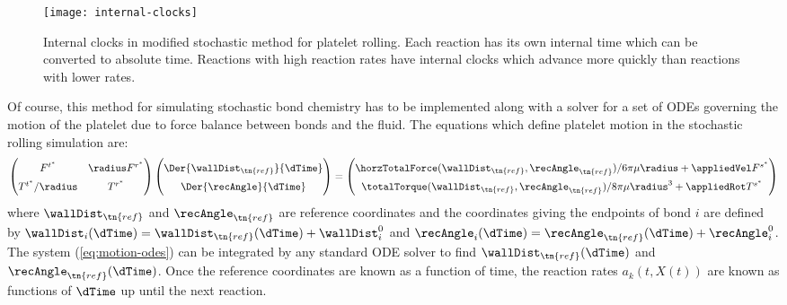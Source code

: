 \begin{figure}
  \centering
  \texttt{[image: internal-clocks]}
  \caption[Internal clocks in the modified stochastic method for
  platelet rolling.]{Internal clocks in modified stochastic method for
    platelet rolling. Each reaction has its own internal time which
    can be converted to absolute time. Reactions with high reaction
    rates have internal clocks which advance more quickly than
    reactions with lower rates.}
  \label{fig:internal-clocks}
\end{figure}

Of course, this method for simulating stochastic bond chemistry has to
be implemented along with a solver for a set of ODEs governing the
motion of the platelet due to force balance between bonds and the
fluid. The equations which define platelet motion in the stochastic
rolling simulation are:
\begin{equation}
  \label{eq:motion-odes}
  \renewcommand*{\arraystretch}{1.5}
  \begin{pmatrix}
    F^{t^*} & \radius F^{r^*} \\
    T^{t^*}/\radius & T^{r^*}
  \end{pmatrix}
                      \begin{pmatrix}
                        \Der{\wallDist_\tn{ref}}{\dTime} \\
                        \Der{\recAngle}{\dTime}
                      \end{pmatrix}
            =
              \begin{pmatrix}
                \horzTotalForce(\wallDist_\tn{ref},
                \recAngle_\tn{ref}) / 6\pi\mu\radius + \appliedVel
                F^{s^*} \\
                \totalTorque(\wallDist_\tn{ref}, \recAngle_\tn{ref}) /
                8\pi\mu\radius^3 + \appliedRot T^{s^*}
              \end{pmatrix}
\end{equation}
where $\wallDist_\tn{ref}$ and $\recAngle_\tn{ref}$ are reference
coordinates and the coordinates giving the endpoints of bond $i$ are
defined by
$\wallDist_i(\dTime) = \wallDist_\tn{ref}(\dTime) + \wallDist_i^0$ and
$\recAngle_i(\dTime) = \recAngle_\tn{ref}(\dTime) +
\recAngle_i^0$. The system (\ref{eq:motion-odes}) can be integrated by
any standard ODE solver to find $\wallDist_\tn{ref}(\dTime)$ and
$\recAngle_\tn{ref}(\dTime)$. Once the reference coordinates are known
as a function of time, the reaction rates $a_k(t, X(t))$ are known as
functions of $\dTime$ up until the next reaction.

